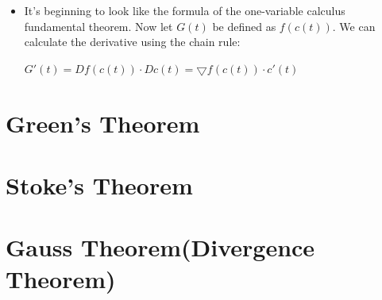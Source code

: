 \documentclass[12pt,a4paper]{article}
\begin{document}
\begin{itemize}
		\item It's beginning to look like the formula of the one-variable calculus fundamental theorem. Now let $G(t)$ be defined as $f(c(t))$. We can calculate the derivative using the chain rule:\\
		\begin{center}
			$G'(t) = Df(c(t))\cdot Dc(t) = \bigtriangledown f(c(t))\cdot c'(t)$
		\end{center}
		
	\end{itemize}
	
	\newpage
	
	\section{Green's Theorem}
	
	\newpage
	
	\section{Stoke's Theorem}
	
	\newpage
	
	\section{Gauss Theorem(Divergence Theorem)}
	
	
	

	
	
	

	
\end{document}
